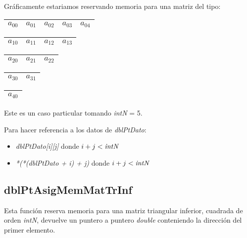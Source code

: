 \par Gr\'aficamente estariamos reservando memoria para una matriz del tipo:

\begin{flushleft}
	\begin{tabular}{|c|c|c|c|c|}
	\hline
	$a_{00}$ & $a_{01}$ & $a_{02}$ & $a_{03}$ & $a_{04}$ \\
	\hline
	\end{tabular}
\newline	
	\begin{tabular}{|c|c|c|c|}
	\hline
	$a_{10}$ & $a_{11}$ & $a_{12}$ & $a_{13}$ \\
	\hline
	\end{tabular}
\newline
	\begin{tabular}{|c|c|c|}
	\hline
	$a_{20}$ & $a_{21}$ & $a_{22}$ \\
	\hline
	\end{tabular}
\newline
	\begin{tabular}{|c|c|}
	\hline
	$a_{30}$ & $a_{31}$ \\
	\hline
	\end{tabular}
\newline
	\begin{tabular}{|c|}
	\hline
	$a_{40}$ \\
	\hline
	\end{tabular}
\end{flushleft}

Este es un caso particular tomando \emph{intN} = 5.\newline

Para hacer referencia a los datos de \emph{dblPtDato}:

\begin{itemize}
\item \emph{dblPtDato[i][j]} donde $i + j < \emph{intN}$
\item \emph{*(*(dblPtDato + i) + j)} donde $i + j < \emph{intN}$
\end{itemize}

\subsection{dblPtAsigMemMatTrInf}
Esta funci\'on reserva memoria para una matriz triangular inferior, cuadrada
de orden \emph{intN}, devuelve un puntero a puntero \emph{double} conteniendo
la direcci\'on del primer elemento.\newline

